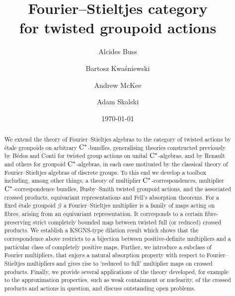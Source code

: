 \documentclass[11 pt, leqno]{amsart}
\numberwithin{equation}{section}
\theoremstyle{plain}
\theoremstyle{definition}
\newcommand*{\nb}{\nobreakdash}
\newcommand{\G}{\mathcal G} %
\newcommand{\cst}{\ifmmode\mathrm{C}^*\else{$\mathrm{C}^*$}\fi}
\begin{document}
\author{Alcides Buss}
    \address{Departamento de Matem\'atica, Universidade Federal de Santa Catarina, 88.040-900 Florian\'opolis SC, Brazil}

\author{Bartosz Kwa\'sniewski}
    \address{ Faculty of Mathematics, University of Bia\l ystok, ul. K. Cio\l kowskiego 1M, 15-245, Bia\l ystok, Poland}

\author{Andrew McKee}
    \address{ Faculty of Mathematics, University of Bia\l ystok, ul. K. Cio\l kowskiego 1M, 15-245, Bia\l ystok, Poland}

\author{Adam Skalski}
    \address{Institute of Mathematics of the Polish Academy of Sciences, ul.~\'Sniadeckich 8, 00--656 Warszawa, Poland}

\date{\today}


\title{\bf Fourier--Stieltjes category \\
for twisted groupoid actions} %


\begin{abstract} 
We extend the theory of Fourier--Stieltjes algebras to the category of twisted actions by \'etale groupoids on arbitrary $\cst$\nb-bundles, generalising  theories constructed previously by B\'{e}dos and Conti for twisted group actions on unital $\cst$-algebras, and by Renault and others for groupoid $\cst$\nb-algebras, in each case motivated by the classical theory of Fourier--Stieltjes algebras of discrete groups. 
To this end we develop a toolbox including, among other things, a theory of multiplier $\cst$-correspondences, multiplier $\cst$-correspondence bundles, Busby--Smith twisted groupoid actions, and the associated crossed products, equivariant representations and Fell's absorption theorems. 
For a fixed \'etale groupoid $\G$ a Fourier--Stieltjes multiplier is a family of maps acting on fibres, arising from an equivariant representation. 
It corresponds to a certain fibre-preserving strict completely bounded map between twisted full (or reduced) crossed products. 
We establish a KSGNS\nb-type dilation result which shows that the correspondence above restricts to a bijection between positive-definite multipliers and a particular class of completely positive maps.
Further, we introduce a subclass of Fourier multipliers, that  enjoys a natural absorption property with respect to Fourier--Stieltjes multipliers and   gives rise  to `reduced to full' multiplier maps on crossed products. 
Finally, we provide several applications of the theory developed, for example to the approximation properties, such as weak containment or nuclearity, of the crossed products and actions in question, and discuss outstanding open problems.
\end{abstract}
\end{document}
